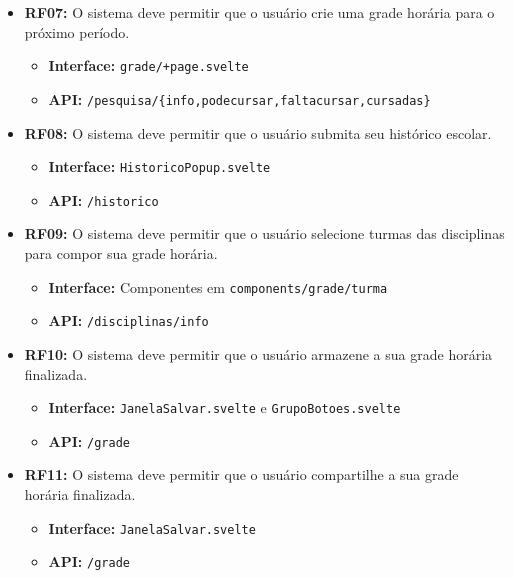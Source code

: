 \begin{itemize}
    \item \textbf{RF07:} O sistema deve permitir que o usuário crie uma grade horária para o próximo período.
    \begin{itemize}
        \item \textbf{Interface:} \verb|grade/+page.svelte|
        \item \textbf{API:} \verb|/pesquisa/{info,podecursar,faltacursar,cursadas}|
    \end{itemize}
    
    \item \textbf{RF08:} O sistema deve permitir que o usuário submita seu histórico escolar.
    \begin{itemize}
        \item \textbf{Interface:} \verb|HistoricoPopup.svelte|
        \item \textbf{API:} \verb|/historico|
    \end{itemize}

    \item \textbf{RF09:} O sistema deve permitir que o usuário selecione turmas das disciplinas para compor sua grade horária.
    \begin{itemize}
        \item \textbf{Interface:} Componentes em \verb|components/grade/turma|
        \item \textbf{API:} \verb|/disciplinas/info|
    \end{itemize}

    \item \textbf{RF10:} O sistema deve permitir que o usuário armazene a sua grade horária finalizada.
    \begin{itemize}
        \item \textbf{Interface:} \verb|JanelaSalvar.svelte| e \verb|GrupoBotoes.svelte|
        \item \textbf{API:} \verb|/grade|
    \end{itemize}

    \item \textbf{RF11:} O sistema deve permitir que o usuário compartilhe a sua grade horária finalizada.
    \begin{itemize}
        \item \textbf{Interface:} \verb|JanelaSalvar.svelte|
        \item \textbf{API:} \verb|/grade|
    \end{itemize}


\end{itemize}
